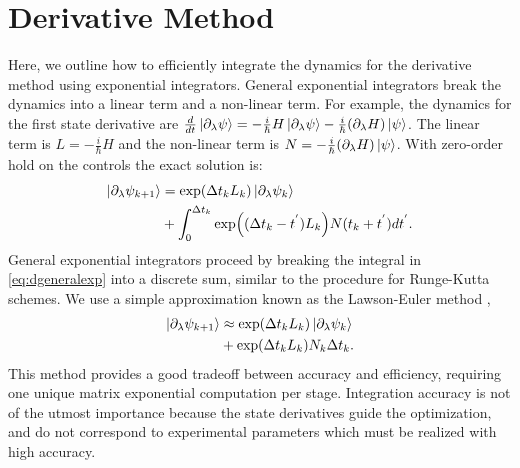 \section{Derivative Method \label{appendix:derivative}}
Here, we outline how to efficiently integrate the dynamics
for the derivative method using exponential integrators.
General exponential integrators break the dynamics into a linear term and a non-linear term.
For example, the dynamics for the first state derivative
are $\frac{d}{dt} \ket{\partial_{\lambda} \psi} =
-\frac{i}{\hbar} H  \ket{\partial_{\lambda} \psi} -
\frac{i}{\hbar} (\partial_{\lambda} H) \ket{\psi}$.
The linear term is $L = -\frac{i}{\hbar} H$ and the non-linear
term is $N = -\frac{i}{\hbar} (\partial_{\lambda} H) \ket{\psi}$.
With zero-order hold on the controls the exact solution is:
\begin{equation}
  \label{eq:dgeneralexp}
  \begin{aligned}
    \ket{\partial_{\lambda} \psi_{k + 1}} &= \exp(\Delta t_{k} L_{k})
    \ket{\partial_{\lambda} \psi_{k}}\\
    &+ \int_{0}^{\Delta t_{k}} \exp((\Delta t_{k} - t^{'})L_{k})
    N(t_{k} + t^{'}) dt^{'}.\\
  \end{aligned}
\end{equation}
General exponential integrators proceed by breaking the integral in \eqref{eq:dgeneralexp}
into a discrete sum, similar to the procedure
for Runge-Kutta schemes. We use a simple approximation known as the Lawson-Euler
method \cite{berland2006solving},
\begin{equation}
  \begin{aligned}
    \ket{\partial_{\lambda} \psi_{k + 1}} &\approx \exp(\Delta t_{k}L_{k})
    \ket{\partial_{\lambda} \psi_{k}}\\
    &+ \exp(\Delta t_{k}L_{k}) N_{k} \Delta t_{k}.\\
  \end{aligned}
\end{equation}
This method provides a good tradeoff between accuracy and efficiency, requiring one unique matrix
exponential computation per stage. Integration accuracy is not of the utmost importance because the
state derivatives guide the optimization, and do not correspond to experimental parameters
which must be realized with high accuracy.




